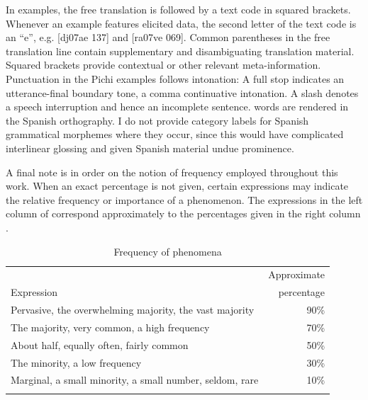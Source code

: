 In examples, the free translation is followed by a text code in squared brackets. Whenever an example features elicited data, the second letter of the text code is an “e”, e.g. [dj07ae 137] and [ra07ve 069]. Common parentheses in the free translation line contain supplementary and disambiguating translation material. Squared brackets provide contextual or other relevant meta-information. Punctuation in the Pichi examples follows intonation: A full stop indicates an utterance-final boundary tone, a comma continuative intonation. A slash denotes a speech interruption and hence an incomplete sentence.  words are rendered in the Spanish orthography. I do not provide category labels for Spanish grammatical morphemes where they occur, since this would have complicated interlinear glossing and given Spanish material undue prominence. 

A final note is in order on the notion of frequency employed throughout this work. When an exact percentage is not given, certain expressions may indicate the relative frequency or importance of a phenomenon. The expressions in the left column of  correspond approximately to the percentages given in the right column \citep{MichaelisEtAl2013}.

\begin{table}
\caption{Frequency of phenomena}
\label{ex:1:23}
\begin{tabularx}{\textwidth}{lr}
\lsptoprule
& Approximate\\
Expression & percentage\\
\midrule 
Pervasive, the overwhelming majority, the vast majority & 90\%\\
The majority, very common, a high frequency & 70\%\\
About half, equally often, fairly common & 50\%\\
The minority, a low frequency & 30\%\\
Marginal, a small minority, a small number, seldom, rare & 10\%\\
\lspbottomrule
\end{tabularx}
\end{table}

